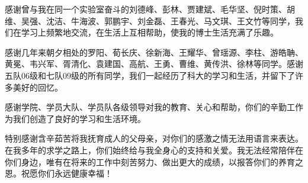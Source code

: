\begin{ack}
感谢曾与我在同一个实验室奋斗的刘德峰、彭林、贾建斌、毛华坚、倪时策、胡维、吴强、沈洁、牛海波、郭鹏宇、刘金磊、王春光、马文琪、王文竹等同学，我们在学习上频繁地交流，在生活上互相帮助，使我的博士生活充满了乐趣。

感谢几年来朝夕相处的罗阳、荀长庆、徐新海、王耀华、曾瑶源、李柱、游皓聃、黄冕、韦兴军、胥清化、袁建国、高航、王勇、曹维、黄传洪、徐林等同学。感谢五队06级和七队09级的所有同学，我们一起经历了科大的学习和生活，并留下了许多美好的回忆。

感谢学院、学员大队、学员队各级领导对我的教育、关心和帮助，你们的辛勤工作为我们创造了良好的学习和生活环境。

特别感谢含辛茹苦将我抚育成人的父母亲，对你们的感激之情无法用语言来表达。在我多年的求学之路上，你们始终给与我全身心的支持和关爱。我无法经常陪伴在你们身边，唯有在将来的工作中刻苦努力、做出更大的成绩，以报答你们的养育之恩。祝愿你们永远健康幸福！
\end{ack}
